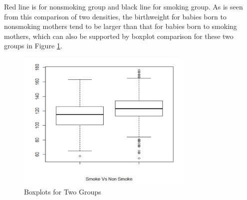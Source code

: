 \documentclass[oneside,12pt]{report}
\begin{document}
Red line is for nonsmoking group and black line for smoking group. As is seen from this comparison of two densities, the birthweight for babies born to nonsmoking mothers tend to be larger than that for babies born to smoking mothers, which can also be supported by boxplot comparison for these two groups in Figure \ref{fig:boxplot}.
\begin{figure}[htb]
    \begin{center}
        \includegraphics[width=0.75\textwidth]{boxplot.png}
    \end{center}
    \caption{Boxplots for Two Groups}
    \label{fig:boxplot}
\end{figure}
\end{document}

